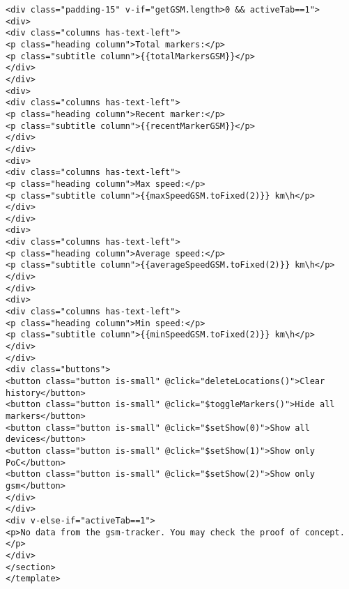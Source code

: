 \begin{lstlisting}
<div class="padding-15" v-if="getGSM.length>0 && activeTab==1">
<div>
<div class="columns has-text-left">
<p class="heading column">Total markers:</p>
<p class="subtitle column">{{totalMarkersGSM}}</p>
</div>
</div>
<div>
<div class="columns has-text-left">
<p class="heading column">Recent marker:</p>
<p class="subtitle column">{{recentMarkerGSM}}</p>
</div>
</div>
<div>
<div class="columns has-text-left">
<p class="heading column">Max speed:</p>
<p class="subtitle column">{{maxSpeedGSM.toFixed(2)}} km\h</p>
</div>
</div>
<div>
<div class="columns has-text-left">
<p class="heading column">Average speed:</p>
<p class="subtitle column">{{averageSpeedGSM.toFixed(2)}} km\h</p>
</div>
</div>
<div>
<div class="columns has-text-left">
<p class="heading column">Min speed:</p>
<p class="subtitle column">{{minSpeedGSM.toFixed(2)}} km\h</p>
</div>
</div>
<div class="buttons">
<button class="button is-small" @click="deleteLocations()">Clear history</button>
<button class="button is-small" @click="$toggleMarkers()">Hide all markers</button>
<button class="button is-small" @click="$setShow(0)">Show all devices</button>
<button class="button is-small" @click="$setShow(1)">Show only PoC</button>
<button class="button is-small" @click="$setShow(2)">Show only gsm</button>
</div>
</div>
<div v-else-if="activeTab==1">
<p>No data from the gsm-tracker. You may check the proof of concept.</p>
</div>
</section>
</template>


\end{lstlisting}
